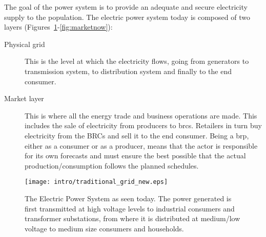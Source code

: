 The goal of the power system is to provide an adequate and secure electricity supply to the population.
The electric power system today is composed of two layers (Figures~\ref{fig:powernow}-\ref{fig:marketnow}): 
\begin{description}
	\item[Physical grid] This is the level at which the electricity flows, going from generators to transmission system, to distribution system and finally to the end consumer.
	\item[Market layer] This is where all the energy trade and business operations are made. This includes the sale of electricity from producers to \glspl{brc}. Retailers in turn buy electricity from the BRCs and sell it to the end consumer. Being a \gls{brp}, either as a consumer or as a producer, means that the actor is responsible for its own forecasts and must ensure the best possible that the actual production/consumption follows the planned schedules.
\end{description}

\begin{figure}[t]
	\centering
	\caption{The Electric Power System as seen today. The power generated is first transmitted at high voltage levels to industrial consumers and transformer substations, from where it is distributed at medium/low voltage to medium size consumers and households.}\label{fig:powernow}
	\texttt{[image: intro/traditional\_grid\_new.eps]}
\end{figure}

